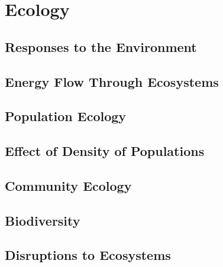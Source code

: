 \documentclass[../bio.tex]{subfiles}
\begin{document}
\chapter{Ecology}
\section{Responses to the Environment}
\section{Energy Flow Through Ecosystems}
\section{Population Ecology}
\section{Effect of Density of Populations}
\section{Community Ecology}
\section{Biodiversity}
\section{Disruptions to Ecosystems}
\end{document}
